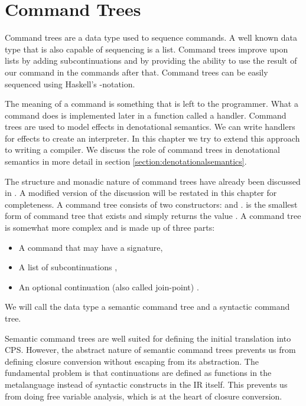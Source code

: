 \section{\label{section:commandtree}Command Trees}
Command trees are a data type used to sequence commands. A well known data type that is also capable of sequencing is a list. Command trees improve upon lists by adding subcontinuations and by providing the ability to use the result of our command in the commands after that. Command trees can be easily sequenced using Haskell's -notation.

The meaning of a command is something that is left to the programmer. What a command does is implemented later in a function called a handler. Command trees are used to model effects in denotational semantics. We can write handlers for effects to create an interpreter. In this chapter we try to extend this approach to writing a compiler. We discuss the role of command trees in denotational semantics in more detail in section \ref{section:denotationalsemantics}.

The structure and monadic nature of command trees have already been discussed in  \autocite{commandtreespoulsen}. A modified version of the discussion will be restated in this chapter for completeness. A command tree consists of two constructors:  and .  is the smallest form of command tree that exists and simply returns the value . A  command tree is somewhat more complex and is made up of three parts:

\begin{itemize}
\item A command  that may have a signature,
\item A list of subcontinuations ,
\item An optional continuation (also called join-point) .
\end{itemize}

We will call the data type  a semantic command tree and  a syntactic command tree.

Semantic command trees are well suited for defining the initial translation into CPS. However, the abstract nature of semantic command trees prevents us from defining closure conversion without escaping from its abstraction. The fundamental problem is that continuations are defined as functions in the metalanguage instead of syntactic constructs in the IR itself. This prevents us from doing free variable analysis, which is at the heart of closure conversion.

